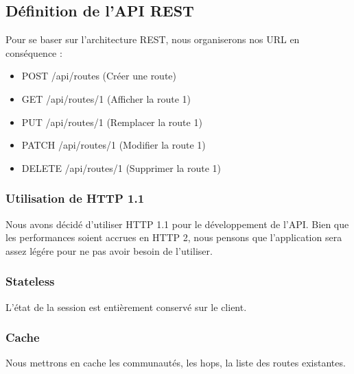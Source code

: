 

\subsection{Définition de l'API REST}
Pour se baser sur l'architecture REST, nous organiserons nos URL en conséquence :
\begin{itemize}
    \item POST /api/routes (Créer une route)
    \item GET /api/routes/1 (Afficher la route 1)
    \item PUT /api/routes/1 (Remplacer la route 1)
    \item PATCH /api/routes/1 (Modifier la route 1)
    \item DELETE /api/routes/1 (Supprimer la route 1)
\end{itemize}

\subsubsection{Utilisation de HTTP 1.1}
Nous avons décidé d'utiliser HTTP 1.1 pour le développement de l'API. Bien que les performances soient accrues en HTTP 2, nous pensons que l'application sera assez légére pour ne pas avoir besoin de l'utiliser.



\subsubsection{Stateless}
L’état de la session est entièrement conservé sur le client.

\subsubsection{Cache}
Nous mettrons en cache les communautés, les hops, la liste des routes existantes.


